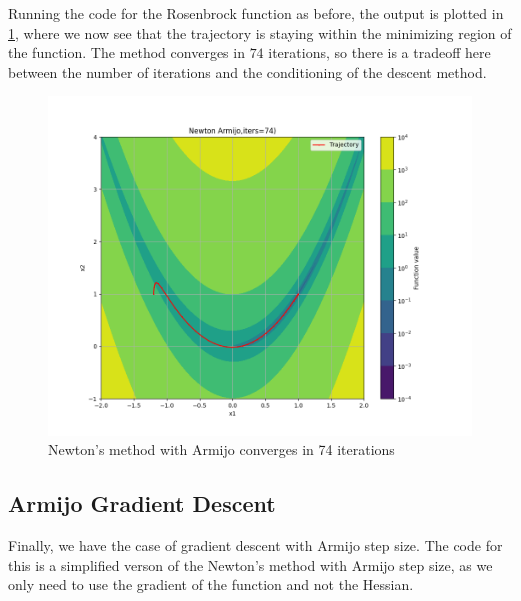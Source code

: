 \documentclass[11pt]{article}
\theoremstyle{problemstyle}
\begin{document}
Running the code for the Rosenbrock function as before, the output is plotted in
\ref{fig:newton_armijo}, where we now see that the trajectory is staying within
the minimizing region of the function. The method converges in $74$ iterations,
so there is a tradeoff here between the number of iterations and the
conditioning of the descent method.

\begin{figure}[H]
  \centering
  \includegraphics[width=.9\textwidth]{newton_armijo.png}
  \caption{Newton's method with Armijo converges in 74 iterations}
  \label{fig:newton_armijo}
\end{figure}

\subsection*{Armijo Gradient Descent}
Finally, we have the case of gradient descent with Armijo step size. The code
for this is a simplified verson of the Newton's method with Armijo step size, as
we only need to use the gradient of the function and not the Hessian.
\end{document}
